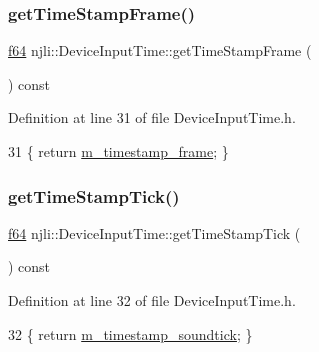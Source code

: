 \subsubsection{\texorpdfstring{get\+Time\+Stamp\+Frame()}{getTimeStampFrame()}}
{\footnotesize\ttfamily \mbox{\hyperlink{_util_8h_a94dab5770726ccbef8c7d026cfbdf8e5}{f64}} njli\+::\+Device\+Input\+Time\+::get\+Time\+Stamp\+Frame (\begin{DoxyParamCaption}{ }\end{DoxyParamCaption}) const\hspace{0.3cm}{\ttfamily [inline]}}



Definition at line 31 of file Device\+Input\+Time.\+h.


\begin{DoxyCode}
31 \{ \textcolor{keywordflow}{return} \mbox{\hyperlink{classnjli_1_1_device_input_time_a798d29d739522cad83bd37986ed15a20}{m\_timestamp\_frame}}; \}
\end{DoxyCode}
\mbox{\label{classnjli_1_1_device_input_time_ad68f0958e6f363d09772286650891b3b}} 
\subsubsection{\texorpdfstring{get\+Time\+Stamp\+Tick()}{getTimeStampTick()}}
{\footnotesize\ttfamily \mbox{\hyperlink{_util_8h_a94dab5770726ccbef8c7d026cfbdf8e5}{f64}} njli\+::\+Device\+Input\+Time\+::get\+Time\+Stamp\+Tick (\begin{DoxyParamCaption}{ }\end{DoxyParamCaption}) const\hspace{0.3cm}{\ttfamily [inline]}}



Definition at line 32 of file Device\+Input\+Time.\+h.


\begin{DoxyCode}
32 \{ \textcolor{keywordflow}{return} \mbox{\hyperlink{classnjli_1_1_device_input_time_a20e05f326dd3a3836a549cba6b536e85}{m\_timestamp\_soundtick}}; \}
\end{DoxyCode}
\mbox{\label{classnjli_1_1_device_input_time_a69e4bb4be69f3ac53f4514a58fd61021}} 
